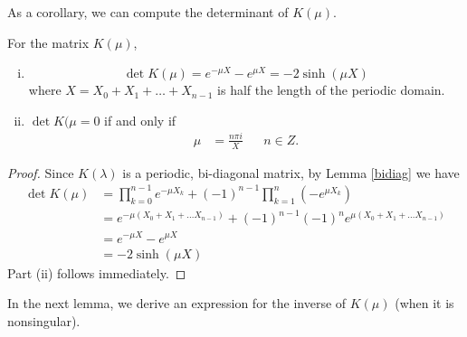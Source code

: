 \documentclass[thesis.tex]{subfiles}
\begin{document}
As a corollary, we can compute the determinant of $K(\mu)$.
\begin{corollary}\label{detKcorr}
For the matrix $K(\mu)$, 
\begin{enumerate}[(i)]
\item 
\begin{equation}\label{detK}
\det K(\mu) = e^{-\mu X} - e^{\mu X} = -2 \sinh (\mu X)
\end{equation}
where $X = X_0 + X_1 + \dots + X_{n-1}$ is half the length of the periodic domain. 
\item $\det K(\mu = 0$ if and only if 
\begin{align*}
\mu &= \frac{n \pi i}{X} && n \in Z.
\end{align*} 
\end{enumerate}
\begin{proof}
Since $K(\lambda)$ is a periodic, bi-diagonal matrix, by Lemma \ref{bidiag} we have
\begin{align*}
\det K(\mu) &= \prod_{k = 0}^{n-1} e^{-\mu X_k} + (-1)^{n-1} \prod_{k = 1}^n (-e^{\mu X_k}) \\
&= e^{-\mu(X_0 + X_1 + \dots X_{n-1})} + (-1)^{n-1} (-1)^n e^{\mu(X_0 + X_1 + \dots X_{n-1})} \\
&= e^{-\mu X} - e^{\mu X} \\
&= -2 \sinh (\mu X)
\end{align*}
Part (ii) follows immediately.
\end{proof}
\end{corollary}

In the next lemma, we derive an expression for the inverse of $K(\mu)$ (when it is nonsingular).
\end{document}
